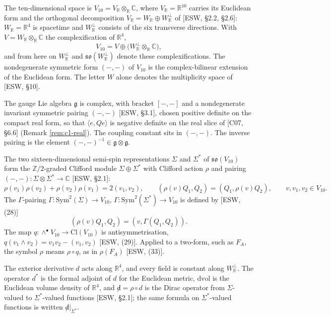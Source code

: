 \begin{definition}[Spaces]
\label{def:c1-spaces}
The ten-dimensional space is $V_{10}=V_{\mathbb R}\otimes_{\mathbb R}\mathbb C$, where $V_{\mathbb R}=\mathbb R^{10}$ carries its Euclidean form and the orthogonal decomposition $V_{\mathbb R}=W_{\mathbb R}\oplus W_{\mathbb R}^\perp$ of [ESW, §2.2, §2.6]: $W_{\mathbb R}=\mathbb R^4$ is spacetime and $W_{\mathbb R}^\perp$ consists of the six transverse directions. With $V=W_{\mathbb R}\otimes_{\mathbb R}\mathbb C$ the complexification of $\mathbb R^4$,
\[
V_{10}=V\oplus\big(W_{\mathbb R}^\perp\otimes_{\mathbb R}\mathbb C\big),
\]
and from here on $W_{\mathbb R}^\perp$ and $\mathfrak{so}(W_{\mathbb R}^\perp)$ denote these complexifications. The nondegenerate symmetric form $(-,-)$ of $V_{10}$ is the complex-bilinear extension of the Euclidean form. The letter $W$ alone denotes the multiplicity space of [ESW, §10].

The gauge Lie algebra $\mathfrak g$ is complex, with bracket $[-,-]$ and a nondegenerate invariant symmetric pairing $(-,-)$ [ESW, §3.1], chosen positive definite on the compact real form, so that $\langle e,Qe\rangle$ is negative definite on the real slice of [C07, §6.6] (Remark \ref{rem:c1-real}). The coupling constant sits in $(-,-)$. The inverse pairing is the element $(-,-)^{-1}\in\mathfrak g\otimes\mathfrak g$.

The two sixteen-dimensional semi-spin representations $\Sigma$ and $\Sigma^*$ of $\mathfrak{so}(V_{10})$ form the $\mathbb Z/2$-graded Clifford module $\Sigma\oplus\Sigma^*$ with Clifford action $\rho$ and pairing $(-,-)\colon\Sigma\otimes\Sigma^*\to\mathbb C$ [ESW, §2.1]:
\[
\rho(v_1)\rho(v_2)+\rho(v_2)\rho(v_1)=2(v_1,v_2),\qquad (\rho(v)Q_1,Q_2)=(Q_1,\rho(v)Q_2),\qquad v,v_1,v_2\in V_{10}.
\]
The $\Gamma$-pairing $\Gamma\colon\mathrm{Sym}^2(\Sigma)\to V_{10}$, $\Gamma\colon\mathrm{Sym}^2(\Sigma^*)\to V_{10}$ is defined by [ESW, (28)]
\[
(\rho(v)Q_1,Q_2)=(v,\Gamma(Q_1,Q_2)).
\]
The map $q\colon\wedge^\bullet V_{10}\to\mathrm{Cl}(V_{10})$ is antisymmetrisation, $q(v_1\wedge v_2)=v_1v_2-(v_1,v_2)$ [ESW, (29)]. Applied to a two-form, such as $F_A$, the symbol $\rho$ means $\rho\circ q$, as in $\rho(F_A)$ [ESW, (33)].

The exterior derivative $d$ acts along $\mathbb R^4$, and every field is constant along $W_{\mathbb R}^\perp$. The operator $d^*$ is the formal adjoint of $d$ for the Euclidean metric, $\mathrm{dvol}$ is the Euclidean volume density of $\mathbb R^4$, and ${\not d}=\rho\circ d$ is the Dirac operator from $\Sigma$-valued to $\Sigma^*$-valued functions [ESW, §2.1]; the same formula on $\Sigma^*$-valued functions is written ${\not d}|_{\Sigma^*}$.
\end{definition}

